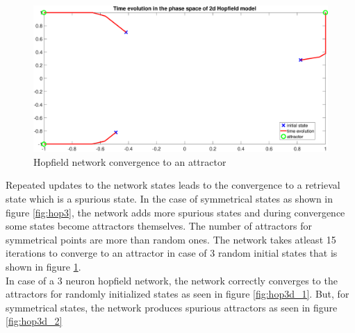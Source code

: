 \begin{figure}
	\captionsetup{format = hang}
	\includegraphics[height = 0.5\textwidth,width = 1\textwidth]{Exercise2/Report/hopfield_2}
	\caption{Hopfield network convergence to an attractor}\label{fig:hop2}
\end{figure}%
Repeated updates to the network states leads to the convergence to a retrieval state which is a spurious state. In the case of symmetrical states as shown in figure \ref{fig:hop3}, the network adds more spurious states and during convergence some  states become attractors themselves. The number of attractors for symmetrical points are more than random ones. The network takes atleast 15 iterations to converge to an attractor in case of 3 random initial states that is shown in figure \ref{fig:hop2}.\\
In case of a 3 neuron hopfield network, the network correctly converges to the attractors for randomly initialized states as seen in figure \ref{fig:hop3d_1}. But, for symmetrical states, the network produces spurious attractors as seen in figure \ref{fig:hop3d_2}
